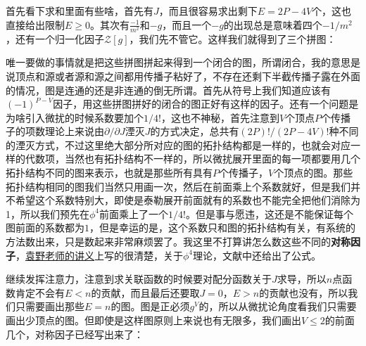 首先看下求和里面有些啥，首先有$J$，而且很容易求出剩下$E=2P-4V$个，这也直接给出限制$E\geq 0$。其次有$\frac{-1}{m^2}$和$-g$，而且一个$-g$的出现总是意味着四个$-1/m^2$，还有一个归一化因子$\mathcal{Z}[g]$，我们先不管它。这样我们就得到了三个拼图：
\begin{figure}[H]
	\centering
\end{figure}

唯一要做的事情就是把这些拼图拼起来得到一个闭合的图，所谓闭合，我的意思是说顶点和源或者源和源之间都用传播子粘好了，不存在还剩下半截传播子露在外面的情况，图是连通的还是非连通的倒无所谓。首先从符号上我们知道应该有$(-1)^{P-V}$因子，用这些拼图拼好的闭合的图正好有这样的因子。还有一个问题是为啥引入微扰的时候系数要加个$1/4!$，这也不神秘，首先注意到$V$个顶点$P$个传播子的项数理论上来说由$\partial/\partial J$湮灭$J$的方式决定，总共有$(2P)!/(2P-4V)!$种不同的湮灭方式，不过这里绝大部分所对应的图的拓扑结构都是一样的，也就会对应一样的代数项，当然也有拓扑结构不一样的，所以微扰展开里面的每一项都要用几个拓扑结构不同的图来表示，也就是那些所有具有$P$个传播子，$V$个顶点的图。那些拓扑结构相同的图我们当然只用画一次，然后在前面乘上个系数就好，但是我们并不希望这个系数特别大，即使是泰勒展开前面就有的系数也不能完全把他们消除为1，所以我们预先在$\phi^4$前面乘上了一个$1/4!$。但是事与愿违，这还是不能保证每个图前面的系数都为$1$，但是幸运的是，这个系数只和图的拓扑结构有关，有系统的方法数出来，只是数起来非常麻烦罢了。我这里不打算讲怎么数这些不同的\textbf{对称因子}，\href{https://person.zju.edu.cn/yuan}{袁野老师的讲义}上写的很清楚，关于$\phi^4$理论，文献\cite{Palmer:2001vq}中还给出了公式。

继续发挥注意力，注意到求关联函数的时候要对配分函数关于$J$求导，所以$n$点函数肯定不会有$E<n$的贡献，而且最后还要取$J=0$，$E>n$的贡献也没有，所以我们只需要画出那些$E=n$的图。图是正必须$g^V$的，所以从微扰论角度看我们只需要画出少顶点的图。但即使是这样图原则上来说也有无限多，我们画出$V\leq 2$的前面几个，对称因子已经写出来了：
\begin{figure}[H]
	\centering
\end{figure}

